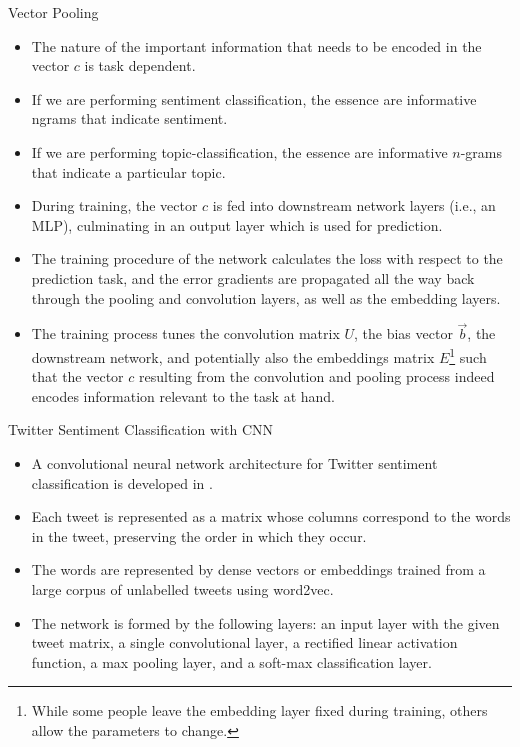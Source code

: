 \begin{frame}{Vector Pooling}
\begin{scriptsize}
\begin{itemize}
\item The nature of the important information that needs to be encoded in the vector $c$ is task dependent. 
\item If we are performing sentiment classification, the essence are informative ngrams that indicate
sentiment.
\item If we are performing topic-classification, the essence are informative $n$-grams that indicate a particular topic.

\item During training, the vector $c$ is fed into downstream network layers (i.e., an MLP), culminating in an output layer which is used for prediction.
\item The training procedure of the network calculates the loss with respect to the prediction task, and the error gradients are propagated all the way back through the pooling and convolution layers, as well as the embedding layers. 
\item The training process tunes the convolution matrix $U$, the bias vector $\vec{b}$, the downstream network, and
potentially also the embeddings matrix $E$\footnote{While some people leave the embedding layer fixed during training, others allow the parameters to change.}  such that the vector $c$ resulting from the convolution
and pooling process indeed encodes information relevant to the task at hand.
\end{itemize}
\end{scriptsize}
\end{frame}



\begin{frame}{Twitter Sentiment Classification with CNN}
\begin{scriptsize}
\begin{itemize}
\item A convolutional neural network architecture for Twitter sentiment classification is developed in \cite{Severyn2015}.
\item  Each tweet is represented as a matrix whose columns correspond to the words in the tweet, preserving the order in which they occur.
\item  The words are represented by dense vectors or embeddings trained from a large corpus of unlabelled tweets using word2vec.
\item  The network is formed by the following layers: an input layer with the given tweet matrix, a  single  convolutional layer, a rectified linear activation function, a max pooling layer, and a soft-max classification layer.
\end{itemize}
\end{scriptsize}
\end{frame}


